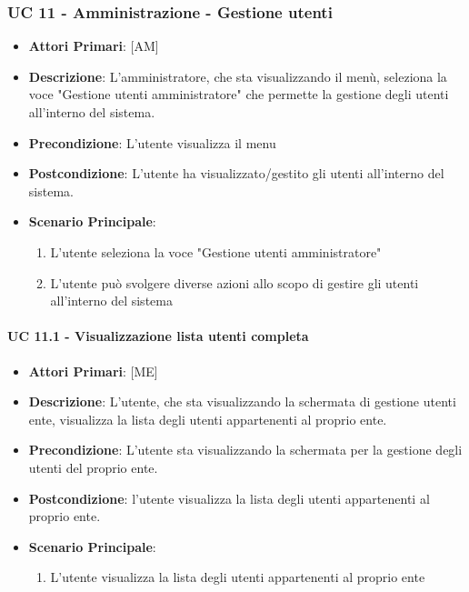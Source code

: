 \subsubsection{UC 11 - Amministrazione - Gestione utenti}
		\begin{itemize}
			\item \textbf{Attori Primari}: [AM]
			\item \textbf{Descrizione}: L'amministratore, che sta visualizzando il menù, seleziona la voce "Gestione utenti amministratore" che permette la gestione degli utenti all'interno del sistema.
			\item \textbf{Precondizione}: L'utente visualizza il menu
			\item \textbf{Postcondizione}: L'utente ha visualizzato/gestito gli utenti all'interno del sistema. 
			\item \textbf{Scenario Principale}:
			\begin{enumerate}
				\item{L'utente seleziona la voce "Gestione utenti amministratore"}
				\item{L'utente può svolgere diverse azioni allo scopo di gestire gli utenti all'interno del sistema}
			\end{enumerate}	
		\end{itemize}

			\paragraph{UC 11.1 - Visualizzazione lista utenti completa}
			\begin{itemize}
				\item \textbf{Attori Primari}: [ME]
				\item \textbf{Descrizione}: L'utente, che sta visualizzando la schermata di gestione utenti ente, visualizza la lista degli utenti appartenenti al proprio ente.
				\item \textbf{Precondizione}: L'utente sta visualizzando la schermata per la gestione degli utenti del proprio ente.
				\item \textbf{Postcondizione}: l'utente visualizza la lista degli utenti appartenenti al proprio ente.
				\item \textbf{Scenario Principale}:
				\begin{enumerate}
					\item{L'utente visualizza la lista degli utenti appartenenti al proprio ente}
				\end{enumerate}	
			\end{itemize}
			
